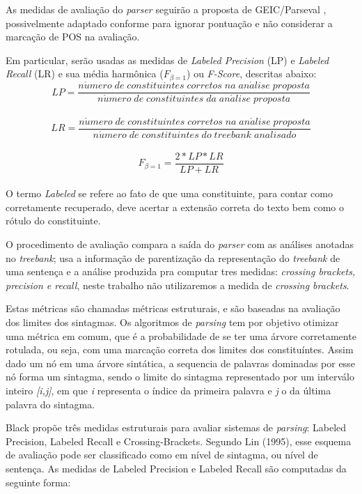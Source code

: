As medidas de avaliação do \emph{parser} seguirão a proposta de GEIC/Parseval \cite{black91}, possivelmente adaptado conforme \cite{collins97} para ignorar pontuação e não considerar a marcação de POS na avaliação. 

Em particular, serão usadas as medidas de \emph{Labeled Precision} (LP) e \emph{Labeled Recall} (LR) e sua média harmônica ($F_{\beta=1}$) ou \emph{F-Score}, descritas abaixo:
\\
$$LP = \frac{n\acute{u}mero\; de\; constituintes\; corretos\; na\; an\acute{a}lise\; proposta}{n\acute{u}mero\; de\; constituintes\; da\; an\acute{a}lise\; proposta}$$
\\
$$LR = \frac{n\acute{u}mero\; de\; constituintes\; corretos\; na\; an\acute{a}lise\; proposta}{n\acute{u}mero\; de\; constituintes\; do\; \mathit{treebank}\; analisado}$$
\\
$$F_{\beta=1} = \frac{2*LP*LR}{LP+LR}$$
\\
O termo \emph{Labeled} se refere ao fato de que uma constituinte, para contar como corretamente recuperado, deve acertar a extensão correta do texto bem como o rótulo do constituinte.

O procedimento de avaliação compara a saída do \emph{parser} com as análises anotadas no \emph{treebank}; usa a informação de parentização da representação do \emph{treebank} de uma sentença e a análise produzida pra computar tres medidas: \emph{crossing brackets, precision e recall}, neste trabalho não utilizaremos a medida de \emph{crossing brackets}.

Estas métricas são chamadas métricas estruturais, e são baseadas na avaliação dos limites dos sintagmas. Os algoritmos de \emph{parsing} tem por objetivo otimizar uma métrica em comum, que é a probabilidade de se ter uma árvore corretamente rotulada, ou seja, com uma marcação correta dos limites dos constituíntes. Assim dado um nó em uma árvore sintática, a sequencia de palavras dominadas por esse nó forma um sintagma, sendo o limite do sintagma representado por um interválo inteiro \emph{[i,j]}, em que \emph{i} representa o índice da primeira palavra e \emph{j} o da última palavra do sintagma.

Black \cite{black91} propõe três medidas estruturais para avaliar sistemas de \emph{parsing}: Labeled Precision, Labeled Recall e Crossing-Brackets. Segundo Lin (1995), esse esquema de avaliação pode ser classificado como em nível de sintagma, ou nível de sentença. 
As medidas de Labeled Precision e Labeled Recall são computadas da seguinte forma:

